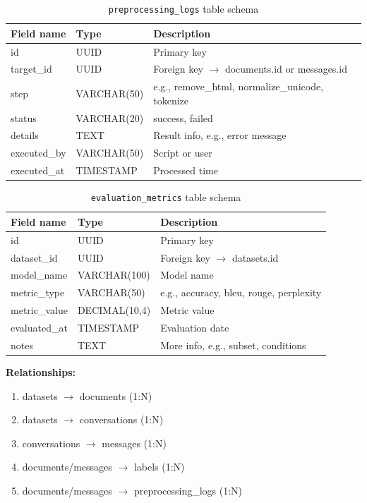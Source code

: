 \documentclass[12pt,oneside,openright,a4paper]{cpe-english-project}
\begin{document}
\begin{table}[H]
\centering
\caption{\texttt{preprocessing\_logs} table schema}\label{tbl:db-prep-logs}
\begin{tabular}{|p{}|p{}|p{}|}
\hline
\textbf{Field name} & \textbf{Type} & \textbf{Description} \\ \hline
id & UUID & Primary key \\ \hline
target\_id & UUID & Foreign key $\rightarrow$ documents.id or messages.id \\ \hline
step & VARCHAR(50) & e.g., remove\_html, normalize\_unicode, tokenize \\ \hline
status & VARCHAR(20) & success, failed \\ \hline
details & TEXT & Result info, e.g., error message \\ \hline
executed\_by & VARCHAR(50) & Script or user \\ \hline
executed\_at & TIMESTAMP & Processed time \\ \hline
\end{tabular}
\end{table}

\begin{table}[H]
\centering
\caption{\texttt{evaluation\_metrics} table schema}\label{tbl:db-eval}
\begin{tabular}{|p{}|p{}|p{}|}
\hline
\textbf{Field name} & \textbf{Type} & \textbf{Description} \\ \hline
id & UUID & Primary key \\ \hline
dataset\_id & UUID & Foreign key $\rightarrow$ datasets.id \\ \hline
model\_name & VARCHAR(100) & Model name \\ \hline
metric\_type & VARCHAR(50) & e.g., accuracy, bleu, rouge, perplexity \\ \hline
metric\_value & DECIMAL(10,4) & Metric value \\ \hline
evaluated\_at & TIMESTAMP & Evaluation date \\ \hline
notes & TEXT & More info, e.g., subset, conditions \\ \hline
\end{tabular}
\end{table}

\newpage
\textbf{Relationships:}
\begin{enumerate}
\item datasets $\rightarrow$ documents (1:N)
\item datasets $\rightarrow$ conversations (1:N)
\item conversations $\rightarrow$ messages (1:N)
\item documents/messages $\rightarrow$ labels (1:N)
\item documents/messages $\rightarrow$ preprocessing\_logs (1:N)
\end{enumerate}
\end{document}
